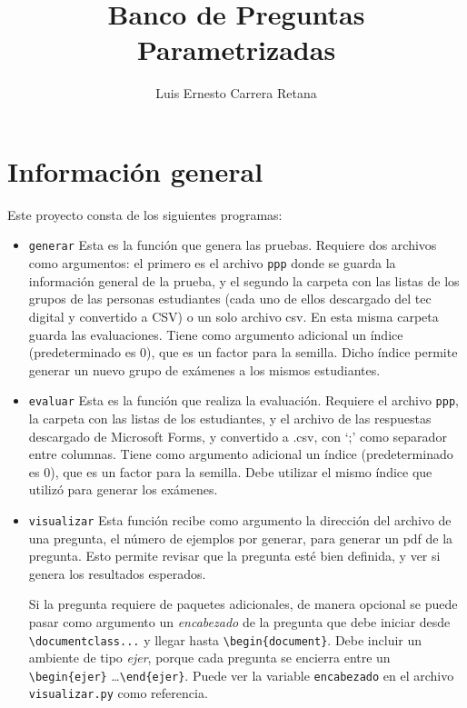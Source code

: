 \documentclass[12pt]{article}
\title{Banco de Preguntas Parametrizadas}
\author{Luis Ernesto Carrera Retana}
\theoremstyle{definition}
\begin{document}
\maketitle

\section{Información general}

Este proyecto consta de los siguientes programas:
\begin{itemize}
  \item \verb|generar| Esta es la función que genera las pruebas. Requiere dos archivos como argumentos: el primero es el archivo \verb|ppp| donde se guarda la información general de la prueba, y el segundo la carpeta con las listas de los grupos de las personas estudiantes (cada uno de ellos descargado del tec digital y convertido a CSV) o un solo archivo csv. En esta misma carpeta guarda las evaluaciones. Tiene como argumento adicional un índice (predeterminado es 0), que es un factor para la semilla. Dicho índice permite generar un nuevo grupo de exámenes a los mismos estudiantes.

  \item \verb|evaluar| Esta es la función que realiza la evaluación. Requiere el archivo \verb|ppp|, la carpeta con las listas de los estudiantes, y el archivo de las respuestas descargado de Microsoft Forms, y convertido a .csv, con `;' como separador entre columnas. Tiene como argumento adicional un índice (predeterminado es 0), que es un factor para la semilla. Debe utilizar el mismo índice que utilizó para generar los exámenes.

  \item \verb|visualizar| Esta función recibe como argumento la dirección del archivo de una pregunta, el número de ejemplos por generar, para generar un pdf de la pregunta. Esto permite revisar que la pregunta esté bien definida, y ver si genera los resultados esperados.

    Si la pregunta requiere de paquetes adicionales, de manera opcional se puede pasar como argumento un \emph{encabezado} de la pregunta que debe iniciar desde \verb|\documentclass...| y llegar hasta \verb|\begin{document}|. Debe incluir un ambiente de tipo \emph{ejer}, porque cada pregunta se encierra entre un \verb|\begin{ejer}| \dots \verb|\end{ejer}|. Puede ver la variable \verb|encabezado| en el archivo \verb|visualizar.py| como referencia.


\end{itemize}
\end{document}
